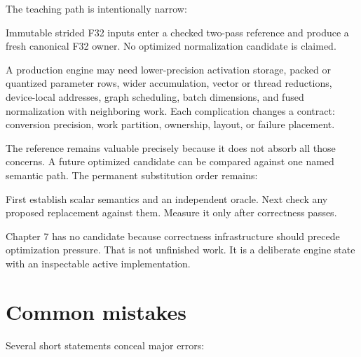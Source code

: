The teaching path is intentionally narrow:

Immutable strided F32 inputs enter a checked two-pass reference and produce a fresh canonical F32 owner. No optimized normalization candidate is claimed.

A production engine may need lower-precision activation storage, packed
or quantized parameter rows, wider accumulation, vector or thread
reductions, device-local addresses, graph scheduling, batch dimensions,
and fused normalization with neighboring work. Each complication changes
a contract: conversion precision, work partition, ownership, layout, or
failure placement.

The reference remains valuable precisely because it does not absorb all
those concerns. A future optimized candidate can be compared against one
named semantic path. The permanent substitution order remains:

First establish scalar semantics and an independent oracle. Next check any proposed replacement against them. Measure it only after correctness passes.

Chapter 7 has no candidate because correctness infrastructure should
precede optimization pressure. That is not unfinished work. It is a
deliberate engine state with an inspectable active implementation.

\section{Common mistakes}\label{common-mistakes-5}

Several short statements conceal major errors:

